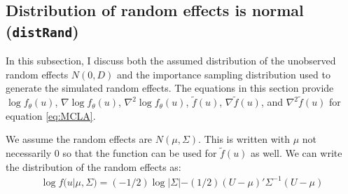 \documentclass{article}
\begin{document}
 

%
%
%


\subsection{Distribution of random effects is normal (\texttt{distRand})}\label{sec:distRand}
%
%

In this subsection, I discuss both the assumed distribution of the unobserved random effects $N(0,D)$ and the importance sampling distribution used to generate the simulated random effects.  The equations in this section provide  $\log f_\theta(u)$, $\nabla \log f_\theta(u)$,  $\nabla^2 \log f_\theta(u)$, $\tilde{f}(u)$, $ \nabla \tilde{f}(u)$, and $\nabla^2 \tilde{f}(u)$  for equation \ref{eq:MCLA}. 

We assume the random effects are $N(\mu, \Sigma)$.  This is written with $\mu$ not necessarily $0$ so that the function can be used for $\tilde{f}(u)$ as well.  We can  write the distribution of the random effects as:
\begin{align}
\log f (u| \mu, \Sigma) = (-1/2) \log |\Sigma| - (1/2) (U-\mu)' \Sigma^{-1} (U-\mu)
\end{align}
\end{document}
